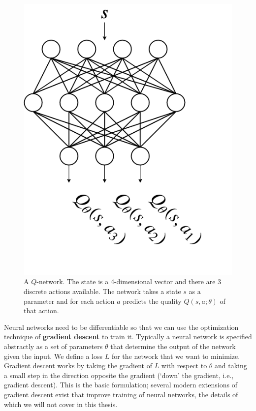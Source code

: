 \documentclass[journal, onecolumn, 12pt, draftclsnofoot]{IEEEtran}
\numberwithin{equation}{section}
\newcommand{\kword}[1]{\textbf{#1}}
\begin{document}
		\begin{figure}[ht]
			\centering
			\includegraphics[scale=0.4]{fig/q-network-state-to-many-actions.png}
			\caption{A $Q$-network. The state is a 4-dimensional vector and there are 3 discrete actions available. The network takes a state $s$ as a parameter and for each action $a$ predicts the quality $Q(s,a;\theta)$ of that action.}
			\label{fig:q-network-state-to-many-actions}
		\end{figure}
		\par Neural networks need to be differentiable so that we can use the optimization technique of \kword{gradient descent} to train it. Typically a neural network is specified abstractly as a set of parameters $\theta$ that determine the output of the network given the input. We define a loss $L$ for the network that we want to minimize. Gradient descent works by taking the gradient of $L$ with respect to $\theta$ and taking a small step in the direction opposite the gradient (`down' the gradient, i.e., gradient descent). This is the basic formulation; several modern extensions of gradient descent exist that improve training of neural networks, the details of which we will not cover in this thesis.
\end{document}
